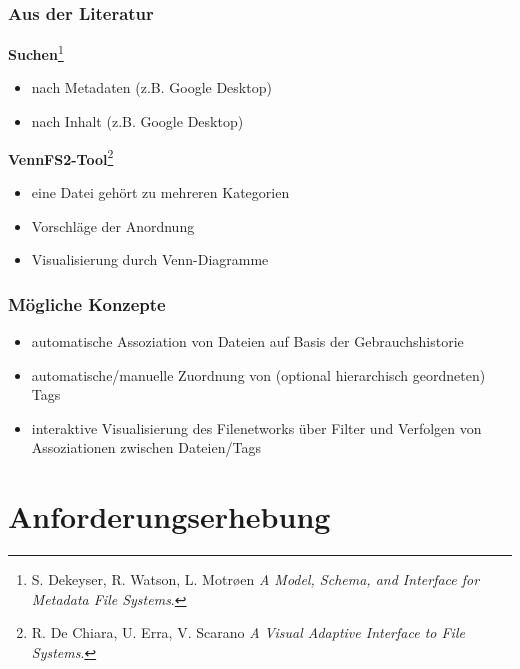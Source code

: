 \begin{frame}

\frametitle{Aus der Literatur}
\label{ausderliteratur}

\textbf{Suchen}\footnote{S. Dekeyser, R. Watson, L. Motrøen \emph{A Model, Schema, and Interface for Metadata File Systems}.}

\begin{itemize}
\item nach Metadaten (z.B. Google Desktop)

\item nach Inhalt (z.B. Google Desktop)

\end{itemize}

\textbf{VennFS2-Tool}\footnote{R. De Chiara, U. Erra, V. Scarano \emph{A Visual Adaptive Interface to File Systems}.}

\begin{itemize}
\item eine Datei gehört zu mehreren Kategorien

\item Vorschläge der Anordnung

\item Visualisierung durch Venn-Diagramme

\end{itemize}

\end{frame}

\begin{frame}

\frametitle{Mögliche Konzepte}
\label{mglichekonzepte}

\begin{itemize}
\item automatische Assoziation von Dateien auf Basis der Gebrauchshistorie

\item automatische\slash manuelle Zuordnung von (optional hierarchisch geordneten) Tags

\item interaktive Visualisierung des Filenetworks über Filter und Verfolgen von Assoziationen zwischen Dateien\slash Tags

\end{itemize}

\end{frame}

\section{Anforderungserhebung}
\label{anforderungserhebung}

